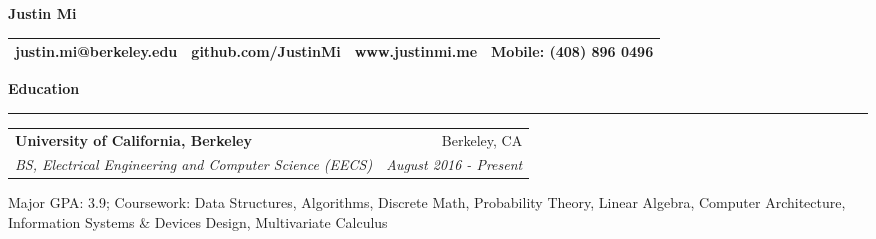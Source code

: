 \documentclass[11pt,letterpaper]{article}
\makeatletter
\newenvironment{topic}[1]
    {
    {\Large \centerline{#1}}
    \vspace*{0.03in}
    \hrule 
    \vspace*{0.05in}
    }
    {}
\newenvironment{event}
    {
    \begin{tabular*}{\textwidth}{l@{\extracolsep{\fill}}r}
    }
    {
    \end{tabular*}
    }
\newenvironment{detail}
    {
    \normalsize
    }
    {
    \vspace*{0.02in}
    }
\newenvironment{head}
    {
    \begin{center}
    \begin{tabular*}{\textwidth}{@{\extracolsep{\fill}} l c c r}
    }
    {
    \hline
    \hline
    \end{tabular*}
    \end{center}
    }
\makeatother
\begin{document}
    \begin{center}
        \huge{\textbf{Justin Mi}}
    \end{center}
    \begin{head}
    justin.mi@berkeley.edu  & github.com/JustinMi & www.justinmi.me & Mobile: (408) 896 0496 \\
    \end{head}








    \begin{topic}{\textbf{Education}}
        \begin{event}
            \textbf{University of California, Berkeley} & Berkeley, CA \\
            \emph{BS, Electrical Engineering and Computer Science (EECS)} & \emph{August 2016 - Present}        
        \end{event}
            \begin{detail}
                Major GPA: 3.9; Coursework: Data Structures, Algorithms, Discrete Math, Probability Theory, Linear Algebra, Computer Architecture, Information Systems \& Devices Design, Multivariate Calculus            
            \end{detail}
    \end{topic} \vspace*{0.1in}
\end{document}
